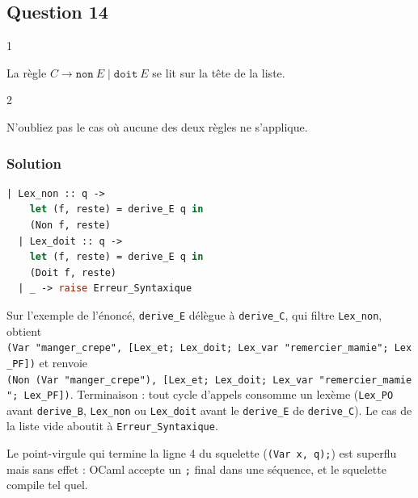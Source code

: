 \documentclass[11pt,a4paper]{article}
\begin{document}
\hypertarget{question-14}{%
\subsection{Question 14}\label{question-14}}

\begin{indication}{1}

La règle \(C\to\mathtt{non}\ E\mid\mathtt{doit}\ E\) se lit sur la tête de la liste.

\end{indication}

\begin{indication}{2}

N'oubliez pas le cas où aucune des deux règles ne s'applique.

\end{indication}

\hypertarget{solution-13}{%
\subsubsection{Solution}\label{solution-13}}

\begin{lstlisting}[language=Caml]
  | Lex_non :: q ->
    let (f, reste) = derive_E q in
    (Non f, reste)
  | Lex_doit :: q ->
    let (f, reste) = derive_E q in
    (Doit f, reste)
  | _ -> raise Erreur_Syntaxique
\end{lstlisting}

Sur l'exemple de l'énoncé, \texttt{derive\_E} délègue à \texttt{derive\_C}, qui filtre \texttt{Lex\_non}, obtient \texttt{(\allowbreak{}Var\ "manger\_crepe",\allowbreak{}\ {[}Lex\_et;\allowbreak{}\ Lex\_doit;\allowbreak{}\ Lex\_var\ "remercier\_mamie";\allowbreak{}\ Lex\_PF{]}\allowbreak{})\allowbreak{}} et renvoie \texttt{(\allowbreak{}Non\ (\allowbreak{}Var\ "manger\_crepe")\allowbreak{},\allowbreak{}\ {[}Lex\_et;\allowbreak{}\ Lex\_doit;\allowbreak{}\ Lex\_var\ "remercier\_mamie";\allowbreak{}\ Lex\_PF{]}\allowbreak{})\allowbreak{}}. Terminaison : tout cycle d'appels consomme un lexème (\texttt{Lex\_PO} avant \texttt{derive\_B}, \texttt{Lex\_non} ou \texttt{Lex\_doit} avant le \texttt{derive\_E} de \texttt{derive\_C}). Le cas de la liste vide aboutit à \texttt{Erreur\_Syntaxique}.

Le point-virgule qui termine la ligne 4 du squelette (\texttt{(Var\ x,\ q);}) est superflu mais sans effet : OCaml accepte un \texttt{;} final dans une séquence, et le squelette compile tel quel.
\end{document}
